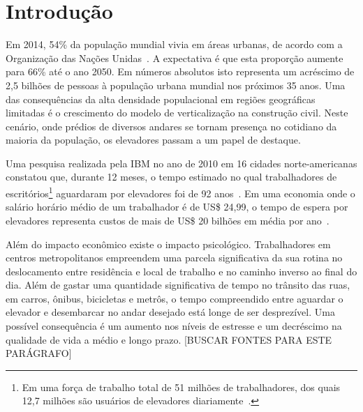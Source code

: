\chapter{\label{chap:intro}Introdução}

Em 2014, 54\% da população mundial vivia em áreas urbanas, de acordo com a Organização das Nações Unidas~\cite{UN14}. A expectativa é que esta proporção aumente para 66\% até o ano 2050. Em números absolutos isto representa um acréscimo de 2,5 bilhões de pessoas à população urbana mundial nos próximos 35 anos. Uma das consequências da alta densidade populacional em regiões geográficas limitadas é o crescimento do modelo de verticalização na construção civil. Neste cenário, onde prédios de diversos andares se tornam presença no cotidiano da maioria da população, os elevadores passam a um papel de destaque.

Uma pesquisa realizada pela IBM no ano de 2010 em 16 cidades norte-americanas constatou que, durante 12 meses, o tempo estimado no qual trabalhadores de escritórios\footnote{Em uma força de trabalho total de 51 milhões de trabalhadores, dos quais 12,7 milhões são usuários de elevadores diariamente~\cite{IBM10}.} aguardaram por elevadores foi de 92 anos~\cite{IBM10}. Em uma economia onde o salário horário médio de um trabalhador é de US\$ 24,99, o tempo de espera por elevadores representa custos de mais de US\$ 20 bilhões em média por ano~\cite{BLS15}.

Além do impacto econômico existe o impacto psicológico. Trabalhadores em centros metropolitanos empreendem uma parcela significativa da sua rotina no deslocamento entre residência e local de trabalho e no caminho inverso ao final do dia. Além de gastar uma quantidade significativa de tempo no trânsito das ruas, em carros, ônibus, bicicletas e metrôs, o tempo compreendido entre aguardar o elevador e desembarcar no andar desejado está longe de ser desprezível. Uma possível consequência é um aumento nos níveis de estresse e um decréscimo na qualidade de vida a médio e longo prazo. {\color{red}[BUSCAR FONTES PARA ESTE PARÁGRAFO]} %

